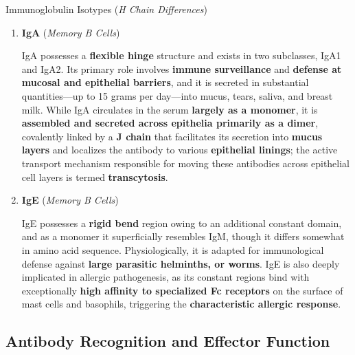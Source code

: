 \begin{core}[label=core:isotype]{Immunoglobulin Isotypes (\textit{H Chain Differences})}
\begin{enumerate}
        \item \textbf{IgA} (\textit{Memory B Cells})


          IgA possesses a \textbf{flexible hinge} structure and exists in two subclasses, IgA1 and IgA2. Its primary role involves \textbf{immune surveillance} and \textbf{defense at mucosal and epithelial barriers}, and it is secreted in substantial quantities---up to 15 grams per day---into mucus, tears, saliva, and breast milk. While IgA circulates in the serum \textbf{largely as a monomer}, it is \textbf{assembled and secreted across epithelia primarily as a dimer}, covalently linked by a \textbf{J chain} that facilitates its secretion into \textbf{mucus layers} and localizes the antibody to various \textbf{epithelial linings}; the active transport mechanism responsible for moving these antibodies across epithelial cell layers is termed \textbf{transcytosis}.

        \item \textbf{IgE} (\textit{Memory B Cells})

          IgE possesses a \textbf{rigid bend} region owing to an additional constant domain, and as a monomer it superficially resembles IgM, though it differs somewhat in amino acid sequence. Physiologically, it is adapted for immunological defense against \textbf{large parasitic helminths, or worms}. IgE is also deeply implicated in allergic pathogenesis, as its constant regions bind with exceptionally \textbf{high affinity to specialized Fc receptors} on the surface of mast cells and basophils, triggering the \textbf{characteristic allergic response}.

      \end{enumerate}

    \end{core}

  \subsection{Antibody Recognition and Effector Function}

